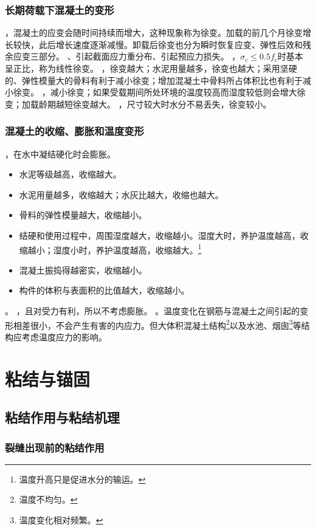 \documentclass{article}
\begin{document}
\subsubsection{长期荷载下混凝土的变形}
，混凝土的应变会随时间持续而增大，这种现象称为徐变。加载的前几个月徐变增长较快，此后增长速度逐渐减慢。卸载后徐变也分为瞬时恢复应变、弹性后效和残余应变三部分。
、引起截面应力重分布、引起预应力损失。
，$\sigma_c\leq0.5f_c$时基本呈正比，称为线性徐变。
，徐变越大；水泥用量越多，徐变也越大；采用坚硬的、弹性模量大的骨料有利于减小徐变；增加混凝土中骨料所占体积比也有利于减小徐变。
，减小徐变；如果受载期间所处环境的温度较高而湿度较低则会增大徐变；加载龄期越短徐变越大。
，尺寸较大时水分不易丢失，徐变较小。
\subsubsection{混凝土的收缩、膨胀和温度变形}
，在水中凝结硬化时会膨胀。
\begin{itemize}
    \item 水泥等级越高，收缩越大。
    \item 水泥用量越多，收缩越大；水灰比越大，收缩也越大。
    \item 骨料的弹性模量越大，收缩越小。
    \item 结硬和使用过程中，周围湿度越大，收缩越小。湿度大时，养护温度越高，收缩越小；湿度小时，养护温度越高，收缩越大。\footnote{温度升高只是促进水分的输运。}
    \item 混凝土振捣得越密实，收缩越小。
    \item 构件的体积与表面积的比值越大，收缩越小。
\end{itemize}
。
，且对受力有利，所以不考虑膨胀。
。温度变化在钢筋与混凝土之间引起的变形相差很小，不会产生有害的内应力。但大体积混凝土结构\footnote{温度不均匀。}以及水池、烟囱\footnote{温度变化相对频繁。}等结构应考虑温度应力的影响。
\section{粘结与锚固}
\subsection{粘结作用与粘结机理}
\subsubsection{裂缝出现前的粘结作用}
\appendix
\newpage
\newcommand{\ans}{\par\noindent答：\setlength{\parindent}{2em}}
\end{document}
